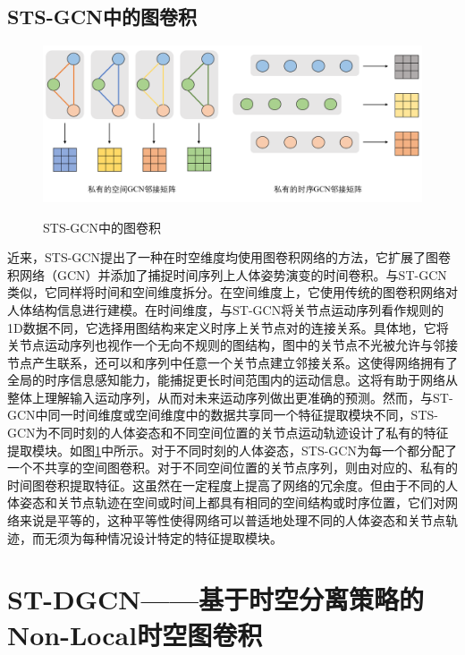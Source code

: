 \subsection{STS-GCN中的图卷积}
\begin{figure}[ht]
    \centering
    \includegraphics[width=1\textwidth]{FigMa/STS-GCN.png}\\
    \vspace{-0.3cm}
    \caption{STS-GCN中的图卷积}
    \label{fig:STS-GCN_structure}
\end{figure}

近来，STS-GCN\parencite{sofianos2021space}提出了一种在时空维度均使用图卷积网络的方法，它扩展了图卷积网络（GCN）并添加了捕捉时间序列上人体姿势演变的时间卷积。与ST-GCN类似，它同样将时间和空间维度拆分。在空间维度上，它使用传统的图卷积网络对人体结构信息进行建模。在时间维度，与ST-GCN将关节点运动序列看作规则的1D数据不同，它选择用图结构来定义时序上关节点对的连接关系。具体地，它将关节点运动序列也视作一个无向不规则的图结构，图中的关节点不光被允许与邻接节点产生联系，还可以和序列中任意一个关节点建立邻接关系。这使得网络拥有了全局的时序信息感知能力，能捕捉更长时间范围内的运动信息。这将有助于网络从整体上理解输入运动序列，从而对未来运动序列做出更准确的预测。然而，与ST-GCN中同一时间维度或空间维度中的数据共享同一个特征提取模块不同，STS-GCN为不同时刻的人体姿态和不同空间位置的关节点运动轨迹设计了私有的特征提取模块。如图\ref{fig:STS-GCN_structure}中所示。对于不同时刻的人体姿态，STS-GCN为每一个都分配了一个不共享的空间图卷积。对于不同空间位置的关节点序列，则由对应的、私有的时间图卷积提取特征。这虽然在一定程度上提高了网络的冗余度。但由于不同的人体姿态和关节点轨迹在空间或时间上都具有相同的空间结构或时序位置，它们对网络来说是平等的，这种平等性使得网络可以普适地处理不同的人体姿态和关节点轨迹，而无须为每种情况设计特定的特征提取模块。

\section{ST-DGCN——基于时空分离策略的Non-Local时空图卷积}

